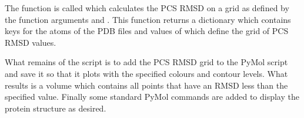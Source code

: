 \documentclass[a4paper,10pt,english,openany,oneside]{sphinxmanual}
\begin{document}
The function {\hyperref[\detokenize{reference/generated/paramagpy.fit.gridsearch_fit_atom_from_pcs:paramagpy.fit.gridsearch_fit_atom_from_pcs}]{}} is called which calculates the PCS RMSD on a grid as defined by the function arguments  and . This function returns a dictionary which contains keys for the atoms of the PDB files and values of  which define the grid of PCS RMSD values.

What remains of the script is to add the PCS RMSD grid to the PyMol script and save it so that it plots with the specified colours and contour levels. What results is a volume which contains all points that have an RMSD less than the specified  value. Finally some standard PyMol commands are added to display the protein structure as desired.
\end{document}
